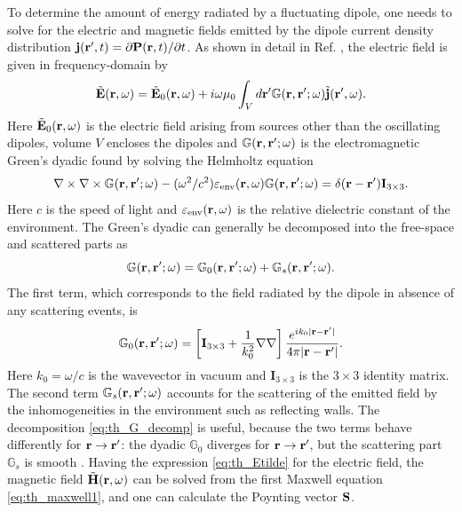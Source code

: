 To determine the amount of energy radiated by a fluctuating dipole, one needs to solve for the electric and magnetic fields emitted by the dipole current density distribution $\mathbf{j}(\mathbf{r}',t)=\partial \mathbf{P}(\mathbf{r},t)/\partial t$. As shown in detail in Ref. \cite{novotny}, the electric field is given in frequency-domain by 
\begin{equation}
 \tilde {\mathbf{E}}(\mathbf{r},\omega) = \tilde {\mathbf{E}}_0(\mathbf{r},\omega) + i \omega \mu_0 \int_V d\mathbf{r}' \mathbb{G}(\mathbf{r},\mathbf{r}';\omega) \tilde{\mathbf{j}}(\mathbf{r}',\omega). \label{eq:th_Etilde}
\end{equation}
Here $\tilde{\mathbf{E}}_0(\mathbf{r},\omega)$ is the electric field arising from sources other than the oscillating dipoles, volume $V$ encloses the dipoles and $\mathbb{G}(\mathbf{r},\mathbf{r}';\omega)$ is the electromagnetic Green's dyadic found by solving the Helmholtz equation \cite{novotny}
 \begin{equation}
 \nabla \times \nabla \times \mathbb{G}(\mathbf{r},\mathbf{r}';\omega) - (\omega^2/c^2) \varepsilon_{\textrm{env}}(\mathbf{r},\omega)\mathbb{G}(\mathbf{r},\mathbf{r}';\omega)  =  \delta(\mathbf{r}-\mathbf{r}')\mathbf{I}_{3 \times 3}. \label{eq:intro_gemdef}
\end{equation}
Here $c$ is the speed of light and $\varepsilon_{\textrm{env}}(\mathbf{r},\omega)$ is the relative dielectric constant of the environment. The Green's dyadic can generally be decomposed into the free-space and scattered parts as
\begin{equation}
 \mathbb{G}(\mathbf{r},\mathbf{r}';\omega ) = \mathbb{G}_0(\mathbf{r},\mathbf{r}';\omega ) + \mathbb{G}_s(\mathbf{r},\mathbf{r}';\omega ). \label{eq:th_G_decomp}
\end{equation}
The first term, which corresponds to the field radiated by the dipole in absence of any scattering events, is \cite{novotny}
\begin{equation}
 \mathbb{G}_0(\mathbf{r},\mathbf{r}';\omega) = \left[\mathbf{I}_{3\times 3} + \frac{1}{k_0^2} \nabla \nabla \right] \frac{e^{ik_0|\mathbf{r}-\mathbf{r}'|}}{4\pi|\mathbf{r}-\mathbf{r}'|}.
\end{equation}
Here $k_0=\omega/c$ is the wavevector in vacuum and $\mathbf{I}_{3\times 3}$ is the $3\times 3$ identity matrix. The second term $\mathbb{G}_s(\mathbf{r},\mathbf{r}';\omega)$ accounts for the scattering of the emitted field by the inhomogeneities in the environment such as reflecting walls. The decomposition \eqref{eq:th_G_decomp} is useful, because the two terms behave differently for $\mathbf{r}\to \mathbf{r}'$: the dyadic $\mathbb{G}_0$ diverges for $\mathbf{r}\to \mathbf{r}'$, but the scattering part $\mathbb{G}_s$ is smooth \cite{novotny}. Having the expression \eqref{eq:th_Etilde} for the electric field, the magnetic field $\tilde{\mathbf{H}}(\mathbf{r},\omega)$ can be solved from the first Maxwell equation \eqref{eq:th_maxwell1}, and one can calculate the Poynting vector $\mathbf{S}$.

